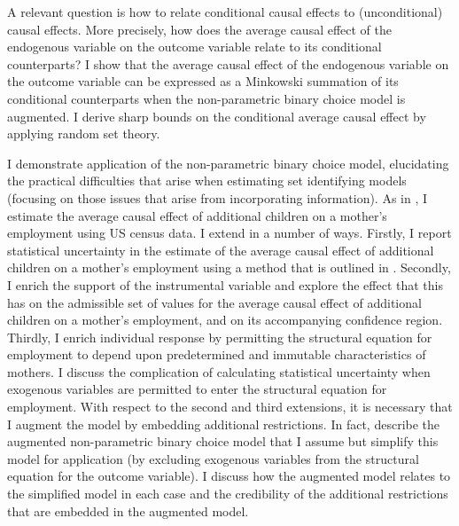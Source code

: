 \documentclass[10pt,a4paper,twoside]{article}
\numberwithin{equation}{section}
\begin{document}
A relevant question is how to relate conditional causal effects to (unconditional) causal effects. More precisely, how does the average causal effect of the endogenous variable on the outcome variable relate to its conditional counterparts? I show that the average causal effect of the endogenous variable on the outcome variable can be expressed as a Minkowski summation of its conditional counterparts when the non-parametric binary choice model is augmented. I derive sharp bounds on the conditional average causal effect by applying random set theory. 

I demonstrate application of the non-parametric binary choice model, elucidating the practical difficulties that arise when estimating set identifying models (focusing on those issues that arise from incorporating information). As in \cite{cr13}, I estimate the average causal effect of additional children on a mother's employment using US census data. I extend \cite{cr13} in a number of ways. Firstly, I report statistical uncertainty in the estimate of the average causal effect of additional children on a mother's employment using a method that is outlined in \cite{cHlr13}. Secondly, I enrich the support of the instrumental variable and explore the effect that this has on the admissible set of values for the average causal effect of additional children on a mother's employment, and on its accompanying confidence region. Thirdly, I enrich individual response by permitting the structural equation for employment to depend upon predetermined and immutable characteristics of mothers. I discuss the complication of calculating statistical uncertainty when exogenous variables are permitted to enter the structural equation for employment. With respect to the second and third extensions, it is necessary that I augment the model by embedding additional restrictions. In fact, \cite{cr13} describe the augmented non-parametric binary choice model that I assume but simplify this model for application (by excluding exogenous variables from the structural equation for the outcome variable). I discuss how the augmented model relates to the simplified model in each case and the credibility of the additional restrictions that are embedded in the augmented model.
\end{document}
